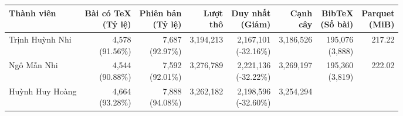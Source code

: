 \begin{table}[H]
    \centering
    \footnotesize
    \setlength{\tabcolsep}{4pt}
    \renewcommand{\arraystretch}{1.18}
    \begin{tabularx}{\textwidth}{@{}X r r r r r r r@{}}
        \toprule
        \textbf{Thành viên} &
        \shortstack[r]{\textbf{Bài có TeX} \\ \textbf{(Tỷ lệ)}} &
        \shortstack[r]{\textbf{Phiên bản} \\ \textbf{(Tỷ lệ)}} &
        \shortstack[r]{\textbf{Lượt} \\ \textbf{thô}} &
        \shortstack[r]{\textbf{Duy nhất} \\ \textbf{(Giảm)}} &
        \shortstack[r]{\textbf{Cạnh} \\ \textbf{cây}} &
        \shortstack[r]{\textbf{BibTeX} \\ \textbf{(Số bài)}} &
        \shortstack[r]{\textbf{Parquet} \\ \textbf{(MiB)}} \\
        \midrule
        Trịnh Huỳnh Nhi &
            \shortstack[r]{4,578 \\ {\scriptsize (91.56\%)}} &
            \shortstack[r]{7,687 \\ {\scriptsize (92.97\%)}} &
            3,194,213 &
            \shortstack[r]{2,167,101 \\ {\scriptsize (-32.16\%)}} &
            3,186,526 &
            \shortstack[r]{195,076 \\ {\scriptsize (3,888)}} &
            217.22 \\
        \addlinespace[3pt]
        Ngô Mẫn Nhi &
            \shortstack[r]{4,544 \\ {\scriptsize (90.88\%)}} &
            \shortstack[r]{7,592 \\ {\scriptsize (92.01\%)}} &
            3,276,789 &
            \shortstack[r]{2,221,136 \\ {\scriptsize (-32.22\%)}} &
            3,269,197 &
            \shortstack[r]{195,360 \\ {\scriptsize (3,819)}} &
            222.02 \\
        \addlinespace[3pt]
        Huỳnh Huy Hoàng &
            \shortstack[r]{4,664 \\ {\scriptsize (93.28\%)}} &
            \shortstack[r]{7,888 \\ {\scriptsize (94.08\%)}} &
            3,262,182 &
            \shortstack[r]{2,198,596 \\ {\scriptsize (-32.60\%)}} &
            3,254,294 &

\end{tabularx}
\end{table}

